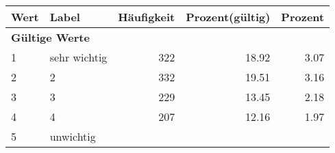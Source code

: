      \begin{longtable}{lXrrr}
     \toprule
     \textbf{Wert} & \textbf{Label} & \textbf{Häufigkeit} & \textbf{Prozent(gültig)} & \textbf{Prozent} \\
     \endhead
     \midrule
     \multicolumn{5}{l}{\textbf{Gültige Werte}}\\

     1 &
     \multicolumn{1}{X}{ sehr wichtig   } &


       \num{322} &
       \num[round-mode=places,round-precision=2]{18.92} &
         \num[round-mode=places,round-precision=2]{3.07} \\

     2 &
     \multicolumn{1}{X}{ 2   } &


       \num{332} &
       \num[round-mode=places,round-precision=2]{19.51} &
         \num[round-mode=places,round-precision=2]{3.16} \\

     3 &
     \multicolumn{1}{X}{ 3   } &


       \num{229} &
       \num[round-mode=places,round-precision=2]{13.45} &
         \num[round-mode=places,round-precision=2]{2.18} \\

     4 &
     \multicolumn{1}{X}{ 4   } &


       \num{207} &
       \num[round-mode=places,round-precision=2]{12.16} &
         \num[round-mode=places,round-precision=2]{1.97} \\

     5 &
     \multicolumn{1}{X}{ unwichtig   } &



\end{longtable}
